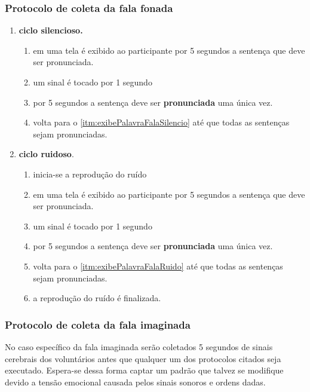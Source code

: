 				
		    \subsubsection{Protocolo de coleta da fala fonada}
		    	\label{sec:coletaFalaFonada}
			    \begin{enumerate}
			    	\item \textbf{ciclo silencioso.}
			    	\begin{enumerate}
			    		\item em uma tela é exibido ao participante por 5 segundos a sentença que deve ser pronunciada.\label{itm:exibePalavraFalaSilencio}
			    		\item um sinal é tocado por 1 segundo
			    		\item por 5 segundos a sentença deve ser \textbf{pronunciada} uma única vez.
			    		\item volta para o \autoref{itm:exibePalavraFalaSilencio} até que todas as sentenças sejam pronunciadas.
			    	\end{enumerate}
			    	
			    	\item \textbf{ciclo ruidoso}.
			    	\begin{enumerate}
			    		\item inicia-se a reprodução do ruído
			    		\item em uma tela é exibido ao participante por 5 segundos a sentença que deve ser pronunciada.\label{itm:exibePalavraFalaRuido}
			    		\item um sinal é tocado por 1 segundo
			    		\item por 5 segundos a sentença deve ser \textbf{pronunciada} uma única vez.
			    		\item volta para o \autoref{itm:exibePalavraFalaRuido} até que todas as sentenças sejam pronunciadas.
			    		\item a reprodução do ruído é finalizada.
			    	\end{enumerate}
			    \end{enumerate}
		    
		    \subsubsection{Protocolo de coleta da fala imaginada}
		    	\label{sec:coletaFalaImaginada}
  			    \par No caso específico da fala imaginada serão coletados 5 segundos de sinais cerebrais dos voluntários antes que qualquer um dos protocolos citados seja executado. Espera-se dessa forma captar um padrão que talvez se modifique devido a tensão emocional causada pelos sinais sonoros e ordens dadas.
  			    
